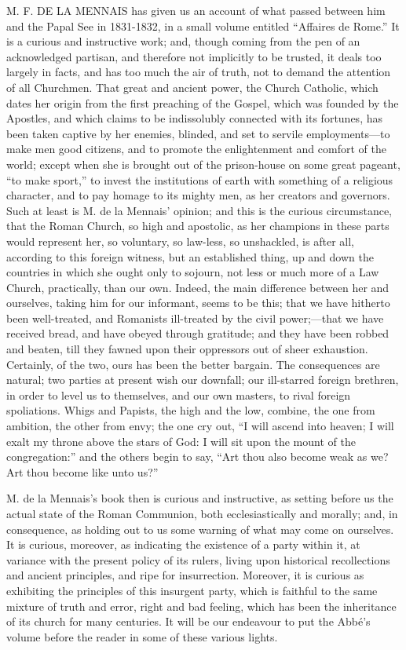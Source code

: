 M. F. DE
LA MENNAIS
has given us an account of what passed between him and the Papal See
in 1831-1832, in a small volume entitled ``Affaires de Rome.'' It is a
curious and instructive work; and, though coming from the pen of an
acknowledged partisan, and therefore not implicitly to be trusted, it
deals too largely in facts, and has too much the air of truth, not to
demand the attention of all Churchmen. That great and ancient power,
the Church Catholic, which dates her origin from the first preaching
of the Gospel, which was founded by the Apostles, and which claims to
be indissolubly connected with its fortunes, has been taken captive by
her enemies, blinded, and set to servile employments—to make men
good citizens, and to promote the enlightenment and comfort of the
world; except when she is brought out of the prison-house on some
great pageant, ``to make sport,'' to invest the institutions of earth
with something of a religious character, and to pay homage to its
mighty men, as her creators and governors. Such at least is M. de la
Mennais' opinion; and this is the curious circumstance, that the Roman
Church, so high and apostolic, as her champions in these parts would
represent her, so voluntary, so law-less, so unshackled, is after all,
according to this foreign witness, but an established thing, up
and down the countries in which she ought only to sojourn, not less or
much more of a Law Church, practically, than our own. Indeed, the main
difference between her and ourselves, taking him for our informant,
seems to be this; that we have hitherto been well-treated, and
Romanists ill-treated by the civil power;—that we have received
bread, and have obeyed through gratitude; and they have been robbed
and beaten, till they fawned upon their oppressors out of sheer
exhaustion. Certainly, of the two, ours has been the better bargain.
The consequences are natural; two parties at present wish our
downfall; our ill-starred foreign brethren, in order to level us to
themselves, and our own masters, to rival foreign spoliations. Whigs
and Papists, the high and the low, combine, the one from ambition, the
other from envy; the one cry out, ``I will ascend into heaven; I will
exalt my throne above the stars of God: I will sit upon the mount of
the congregation:'' and the others begin to say, ``Art thou also become
weak as we? Art thou become like unto us?''

M. de la Mennais's book then is curious and
instructive, as setting before us the actual state of the Roman
Communion, both ecclesiastically and morally; and, in consequence, as
holding out to us some warning of what may come on ourselves. It is
curious, moreover, as indicating the existence of a party within it,
at variance with the present policy of its rulers, living upon
historical recollections and ancient principles, and ripe for
insurrection. Moreover, it is curious as exhibiting the principles of
this insurgent party, which is faithful to the same mixture of truth
and error, right and bad feeling, which has been the inheritance of
its church for many centuries. It will be our endeavour to put the Abbé's
volume before the reader in some of these various lights.

